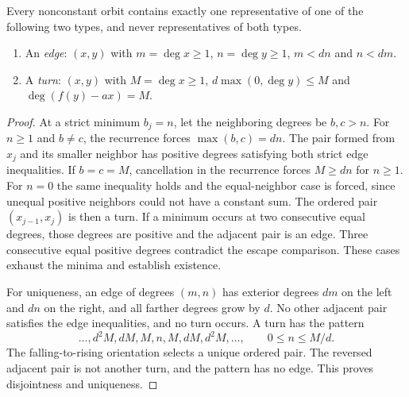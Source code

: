 \begin{proposition}\label{prop:valleys}
Every nonconstant orbit contains exactly one representative of one
of the following two types, and never representatives of both types.
\begin{enumerate}
\item An \emph{edge}: $(x,y)$ with $m=\deg x\ge1$,
$n=\deg y\ge1$, $m<dn$ and $n<dm$.
\item A \emph{turn}: $(x,y)$ with $M=\deg x\ge1$,
$d\max(0,\deg y)\le M$ and $\deg(f(y)-a x)=M$.
\end{enumerate}
\end{proposition}
\begin{proof}
At a strict minimum $b_j=n$, let the neighboring degrees be $b,c>n$.
For $n\ge1$ and $b\ne c$, the recurrence forces
$\max(b,c)=dn$. The pair formed from $x_j$ and its smaller
neighbor has positive degrees satisfying both strict edge
inequalities. If $b=c=M$, cancellation in the recurrence forces
$M\ge dn$ for $n\ge1$. For $n=0$ the same inequality holds
and the equal-neighbor case is forced, since unequal positive
neighbors could not have a constant sum. The ordered pair
$(x_{j-1},x_j)$ is then a turn. If a minimum occurs at two
consecutive equal degrees, those degrees are positive and the
adjacent pair is an edge. Three consecutive equal positive
degrees contradict the escape comparison. These cases exhaust
the minima and establish existence.

For uniqueness, an edge of degrees $(m,n)$ has exterior degrees
$dm$ on the left and $dn$ on the right, and all farther degrees
grow by $d$. No other adjacent pair satisfies the edge inequalities,
and no turn occurs. A turn has the pattern
\begin{equation}\label{eq:turn-pattern}
 \ldots,d^2M,dM,M,n,M,dM,d^2M,\ldots,
 \qquad 0\le n\le M/d.
\end{equation}
The falling-to-rising orientation selects a unique ordered pair.
The reversed adjacent pair is not another turn, and the pattern
has no edge. This proves disjointness and uniqueness.
\end{proof}

